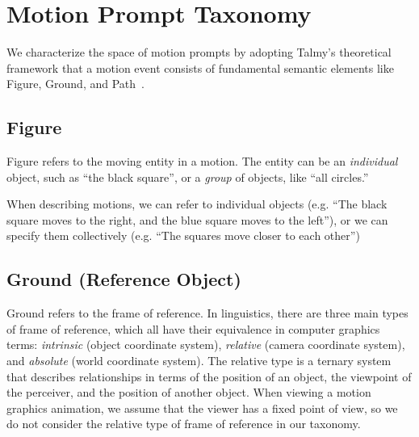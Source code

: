 \section{Motion Prompt Taxonomy}


We characterize the space of motion prompts by adopting Talmy's
theoretical framework that a motion event consists of fundamental
semantic elements like Figure, Ground, and
Path~\cite{talmy1975motion}. 


\subsection{Figure}
Figure refers to the moving entity in a motion.
The entity can be an \textit{individual} object, such as ``the black square'', or a \textit{group} of objects, like ``all circles.''

When describing motions, we can refer to individual objects
(e.g. ``The black square moves to the right, and the blue square moves
to the left''), or we can specify them collectively (e.g. ``The
squares move closer to each other'')

\subsection{Ground (Reference Object)}
Ground refers to the frame of reference.  In linguistics, there are
three main types of frame of reference, which all have their
equivalence in computer graphics terms: \textit{intrinsic} (object
coordinate system), \textit{relative} (camera coordinate system), and
\textit{absolute} (world coordinate system). The relative type is a
ternary system that describes relationships in terms of the position
of an object, the viewpoint of the perceiver, and the position of
another object.  When viewing a motion graphics animation, we assume
that the viewer has a fixed point of view, so we do not consider the
relative type of frame of reference in our taxonomy.

